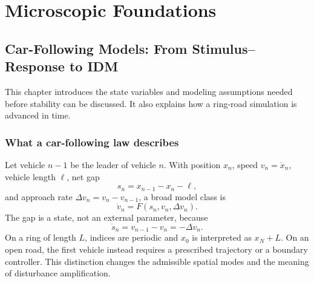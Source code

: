 \documentclass[11pt,a4paper,openany]{book}
\numberwithin{equation}{chapter}
\numberwithin{figure}{chapter}
\numberwithin{table}{chapter}
\newcommand{\chapterguide}[1]{\begin{tcolorbox}[keybox,title=Chapter guide]#1\end{tcolorbox}}
\begin{document}
\tableofcontents

\mainmatter
\part{Microscopic Foundations}

\chapter{Car-Following Models: From Stimulus--Response to IDM}
\chapterguide{This chapter introduces the state variables and modeling assumptions needed before stability can be discussed. It also explains how a ring-road simulation is advanced in time.}

\section{What a car-following law describes}
Let vehicle $n-1$ be the leader of vehicle $n$. With position $x_n$, speed $v_n=\dot x_n$, vehicle length $\ell$, net gap
\begin{equation}
s_n=x_{n-1}-x_n-\ell,
\end{equation}
and approach rate $\Delta v_n=v_n-v_{n-1}$, a broad model class is
\begin{equation}
\dot v_n=F(s_n,v_n,\Delta v_n).
\end{equation}
The gap is a state, not an external parameter, because
\begin{equation}
\dot s_n=v_{n-1}-v_n=-\Delta v_n.
\end{equation}
On a ring of length $L$, indices are periodic and $x_0$ is interpreted as $x_N+L$. On an open road, the first vehicle instead requires a prescribed trajectory or a boundary controller. This distinction changes the admissible spatial modes and the meaning of disturbance amplification.
\end{document}
